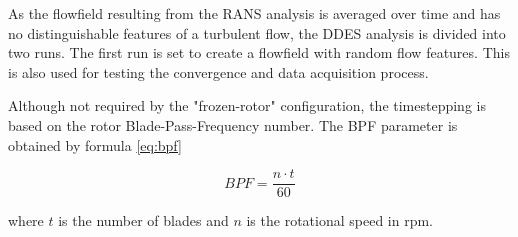 %

As the flowfield resulting from the RANS analysis is averaged over time and has no distinguishable features of a turbulent flow, the DDES analysis is divided into two runs. The first run is set to create a flowfield with random flow features. This is also used for testing the convergence and data acquisition process.

Although not required by the "frozen-rotor" configuration, the timestepping is based on the rotor Blade-Pass-Frequency number. The BPF parameter is obtained by formula \ref{eq:bpf}

\begin{equation} \label{eq:bpf}
BPF = \frac{n \cdot t}{60}
\end{equation}

\noindent where $t$ is the number of blades and $n$ is the rotational speed in rpm.

